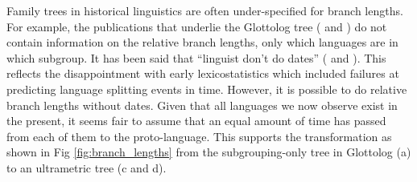 \documentclass[a4paper,10pt]{article} %
\begin{document}
%
%
%    
Family trees in historical linguistics are often under-specified for branch lengths. For example, the publications that underlie the Glottolog tree (\citet{blust_2009, blust_2014} and \citet{blust_chen_2017}) do not contain information on the relative branch lengths, only which languages are in which subgroup. It has been said that ``linguist don't do dates'' (\citet{mcmahon2006linguists} and \citet{gray2011language}). This reflects the disappointment with early lexicostatistics which included failures at predicting language splitting events in time. However, it is possible to do relative branch lengths without dates. Given that all languages we now observe exist in the present, it seems fair to assume that an equal amount of time has passed from each of them to the proto-language. This supports the transformation as shown in Fig \ref{fig:branch_lengths} from the subgrouping-only tree in Glottolog (a) to an ultrametric tree (c and d).
\end{document}
